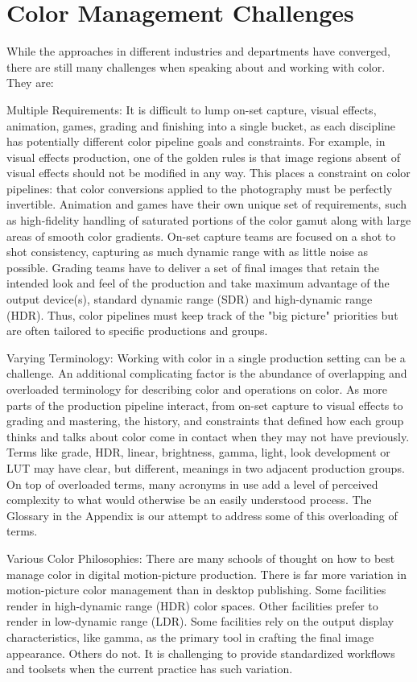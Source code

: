 \section{Color Management Challenges}%
\label{sec:color-management-challenges}

While the approaches in different industries and departments have converged, there are still many challenges when speaking about and working with color. They are:

Multiple Requirements: It is difficult to lump on-set capture, visual effects, animation, games, grading and finishing into a single bucket, as each discipline has potentially different color pipeline goals and constraints. For example, in visual effects production, one of the golden rules is that image regions absent of visual effects should not be modified in any way. This places a constraint on color pipelines: that color conversions applied to the photography must be perfectly invertible. Animation and games have their own unique set of requirements, such as high-fidelity handling of saturated portions of the color gamut along with large areas of smooth color gradients. On-set capture teams are focused on a shot to shot consistency, capturing as much dynamic range with as little noise as possible. Grading teams have to deliver a set of final images that retain the intended look and feel of the production and take maximum advantage of the output device(s), standard dynamic range (SDR) and high-dynamic range (HDR). Thus, color pipelines must keep track of the "big picture" priorities but are often tailored to specific productions and groups.

Varying Terminology: Working with color in a single production setting can be a challenge. An additional complicating factor is the abundance of overlapping and overloaded terminology for describing color and operations on color. As more parts of the production pipeline interact, from on-set capture to visual effects to grading and mastering, the history, and constraints that defined how each group thinks and talks about color come in contact when they may not have previously. Terms like grade, HDR, linear, brightness, gamma, light, look development or LUT may have clear, but different, meanings in two adjacent production groups. On top of overloaded terms, many acronyms in use add a level of perceived complexity to what would otherwise be an easily understood process. The Glossary in the Appendix is our attempt to address some of this overloading of terms.

Various Color Philosophies: There are many schools of thought on how to best manage color in digital motion-picture production. There is far more variation in motion-picture color management than in desktop publishing. Some facilities render in high-dynamic range (HDR) color spaces. Other facilities prefer to render in low-dynamic range (LDR). Some facilities rely on the output display characteristics, like gamma, as the primary tool in crafting the final image appearance. Others do not. It is challenging to provide standardized workflows and toolsets when the current practice has such variation.

